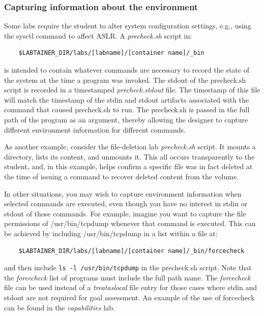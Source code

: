 \documentclass[12pt]{article}
\begin{document}
\subsubsection{Capturing information about the environment}
\label{precheck}
Some labs require the student to alter system configuration settings,
e.g., using the sysctl command to affect ASLR. A \textit{precheck.sh} script in:
\begin{verbatim}
    $LABTAINER_DIR/labs/[labname]/[container name]/_bin
\end{verbatim}
is intended to contain whatever commands are necessary to record the 
state of the system at the time a program was invoked.  The stdout of
the precheck.sh script is recorded in a timestamped \textit{precheck.stdout}
file.  The timestamp of this file will match the timestamp of the stdin and
stdout artifacts associated with the command that caused precheck.sh to run.
The precheck.sh is passed in the full path of the program as an argument, thereby
allowing the designer to capture different environment information for different commands.

As another example, consider the file-deletion lab \textit{precheck.sh} script.
It mounts a directory, lists its content, and unmounts it.  This all occurs 
transparently to the student, and, in this example, helps confirm a specific file
was in fact deleted at the time of issuing a command to recover deleted content from
the volume.

In other situations, you may wish to capture environment information when selected
commands are executed, even though you have no interest in stdin or stdout of those
commands.  For example, imagine you want to capture the file permissions of /usr/bin/tcpdump
whenever that command is executed.  This can be achieved by including /usr/bin/tcpdump in a
list within a file at:
\begin{verbatim}
    $LABTAINER_DIR/labs/[labname]/[container name]/_bin/forcecheck
\end{verbatim}
\noindent and then include \texttt{ls -l /usr/bin/tcpdump} in the precheck.sh script.
Note that the \textit{forcecheck} list of programs must include the full path name.
The \textit{forcecheck} file can be used instead of a \textit{treataslocal} file entry
for those cases where stdin and stdout are not required for goal assessment.  An example of the use of
forcecheck can be found in the \textit{capabilities} lab.  
\end{document}
